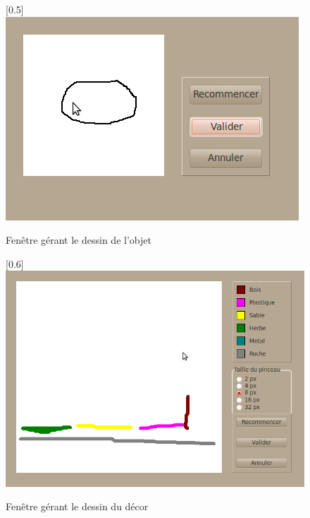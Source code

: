 \begin{center}
\begin{figure}[h]
\begin{center}
\scalebox{0.5}[0.5]{\includegraphics*{../images/dessin_objet.jpg}}
\end{center}
\caption{Fenêtre gérant le dessin de l'objet}
\end{figure}
\end{center}

\begin{center}
\begin{figure}[h]
\begin{center}
\scalebox{0.6}[0.6]{\includegraphics*{../images/dessin_decor.jpg}}
\end{center}
\caption{Fenêtre gérant le dessin du décor}
\end{figure}
\end{center}
